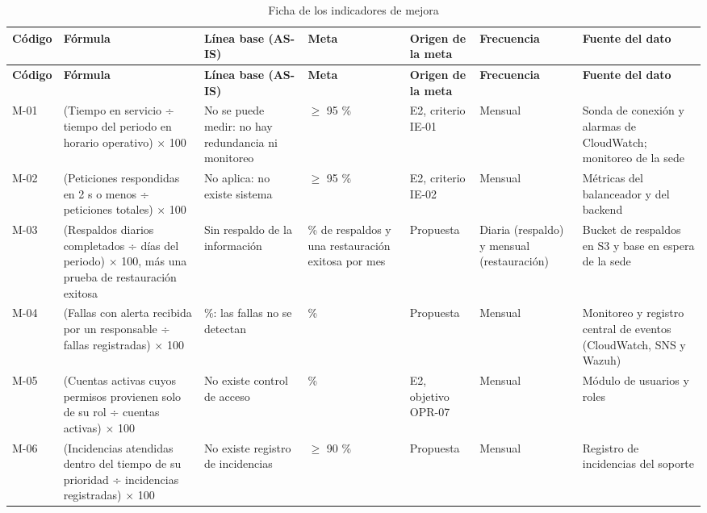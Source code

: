 {\small
\renewcommand{\arraystretch}{1.3}
\begin{longtable}{|>{\raggedright\arraybackslash}p{0.29cm}|>{\raggedright\arraybackslash}p{2.94cm}|>{\raggedright\arraybackslash}p{2.45cm}|>{\raggedright\arraybackslash}p{2.60cm}|>{\raggedright\arraybackslash}p{0.93cm}|>{\raggedright\arraybackslash}p{2.06cm}|>{\raggedright\arraybackslash}p{2.94cm}|}
\caption{Ficha de los indicadores de mejora}\label{tab:cap5-4}\\
\hline
\textbf{Código} & \textbf{Fórmula} & \textbf{Línea base (AS-IS)} & \textbf{Meta} & \textbf{Origen de la meta} & \textbf{Frecuencia} & \textbf{Fuente del dato} \\
\hline
\endfirsthead
\hline
\textbf{Código} & \textbf{Fórmula} & \textbf{Línea base (AS-IS)} & \textbf{Meta} & \textbf{Origen de la meta} & \textbf{Frecuencia} & \textbf{Fuente del dato} \\
\hline
\endhead
M-01 & (Tiempo en servicio ÷ tiempo del periodo en horario operativo) $\times$ 100 & No se puede medir: no hay redundancia ni monitoreo & $\geq$ 95 \% & E2, criterio IE-01 & Mensual & Sonda de conexión y alarmas de CloudWatch; monitoreo de la sede \\
\hline
M-02 & (Peticiones respondidas en 2 s o menos ÷ peticiones totales) $\times$ 100 & No aplica: no existe sistema & $\geq$ 95 \% & E2, criterio IE-02 & Mensual & Métricas del balanceador y del backend \\
\hline
M-03 & (Respaldos diarios completados ÷ días del periodo) $\times$ 100, más una prueba de restauración exitosa & Sin respaldo de la información & 100 \% de respaldos y una restauración exitosa por mes & Propuesta & Diaria (respaldo) y mensual (restauración) & Bucket de respaldos en S3 y base en espera de la sede \\
\hline
M-04 & (Fallas con alerta recibida por un responsable ÷ fallas registradas) $\times$ 100 & 0 \%: las fallas no se detectan & 100 \% & Propuesta & Mensual & Monitoreo y registro central de eventos (CloudWatch, SNS y Wazuh) \\
\hline
M-05 & (Cuentas activas cuyos permisos provienen solo de su rol ÷ cuentas activas) $\times$ 100 & No existe control de acceso & 100 \% & E2, objetivo OPR-07 & Mensual & Módulo de usuarios y roles \\
\hline
M-06 & (Incidencias atendidas dentro del tiempo de su prioridad ÷ incidencias registradas) $\times$ 100 & No existe registro de incidencias & $\geq$ 90 \% & Propuesta & Mensual & Registro de incidencias del soporte \\
\hline
\end{longtable}
}


